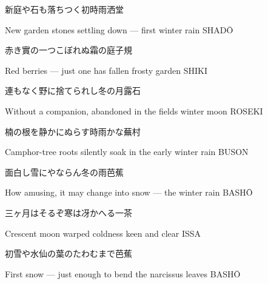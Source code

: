 \begin{haiku}
    {\FH 新庭や石も落ちつく初時雨}\hfill{\FH 洒堂}

    \vin{} New garden
    \vin{} \vin{} stones settling down ---
    \vin{} \vin{} \vin{} first winter rain \hspace{\fill} SHAD\={O}
\end{haiku}

\begin{haiku}
    {\FH 赤き實の一つこぼれぬ霜の庭}\hfill{\FH 子規}

    \vin{} Red berries ---
    \vin{} \vin{} just one has fallen
    \vin{} \vin{} \vin{} frosty garden \hspace{\fill} SHIKI
\end{haiku}

\begin{haiku}
    {\FH 連もなく野に捨てられし冬の月}\hfill{\FH 露石}

    \vin{} Without a companion,
    \vin{} \vin{} abandoned in the fields
    \vin{} \vin{} \vin{} winter moon \hspace{\fill} ROSEKI
\end{haiku}

\begin{haiku}
    {\FH 楠の根を静かにぬらす時雨かな}\hfill{\FH 蕪村}

    \vin{} Camphor-tree roots
    \vin{} \vin{} silently soak in
    \vin{} \vin{} \vin{} the early winter rain \hspace{\fill} BUSON
\end{haiku}

\begin{haiku}
    {\FH 面白し雪にやならん冬の雨}\hfill{\FH 芭蕉}

    \vin{} How amusing,
    \vin{} \vin{} it may change into snow ---
    \vin{} \vin{} \vin{} the winter rain \hspace{\fill} BASH\={O}
\end{haiku}

\begin{haiku}
    {\FH 三ヶ月はそるぞ寒は冴かへる}\hfill{\FH 一茶}

    \vin{} Crescent moon warped
    \vin{} \vin{} coldness
    \vin{} \vin{} \vin{} keen and clear \hspace{\fill} ISSA
\end{haiku}

\begin{haiku}
    {\FH 初雪や水仙の葉のたわむまで}\hfill{\FH 芭蕉}

    \vin{} First snow ---
    \vin{} \vin{} just enough to bend
    \vin{} \vin{} \vin{} the narcissus leaves \hspace{\fill} BASH\={O}
\end{haiku}

